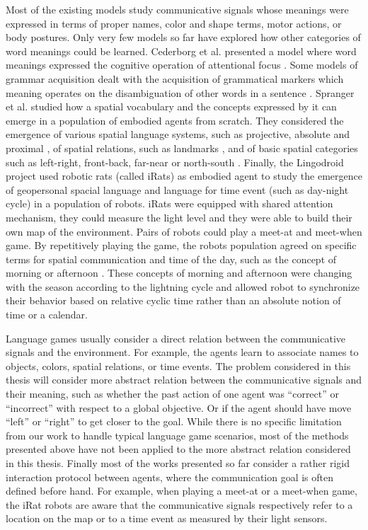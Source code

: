 Most of the existing models study communicative signals whose meanings were expressed in terms of proper names, color and shape terms, motor actions, or body postures. Only very few models so far have explored how other categories of word meanings could be learned. Cederborg et al. presented a model where word meanings expressed the cognitive operation of attentional focus \cite{cederborg2011imitating}. Some models of grammar acquisition dealt with the acquisition of grammatical markers which meaning operates on the disambiguation of other words in a sentence \cite{steels2012fluid}. Spranger et al. studied how a spatial vocabulary and the concepts expressed by it can emerge in a population of embodied agents from scratch. They considered the emergence of various spatial language systems, such as projective, absolute and proximal \cite{spranger2012emergent,spranger2013grounded}, of spatial relations, such as landmarks \cite{spranger2013evolutionary}, and of basic spatial categories such as left-right, front-back, far-near or north-south \cite{spranger2012co}. Finally, the Lingodroid project \cite{schulz2010robots} used robotic rats (called iRats) as embodied agent to study the emergence of geopersonal spacial language and language for time event (such as day-night cycle) in a population of robots. iRats were equipped with shared attention mechanism, they could measure the light level and they were able to build their own map of the environment. Pairs of robots could play a meet-at and meet-when game. By repetitively playing the game, the robots population agreed on specific terms for spatial communication and time of the day, such as the concept of morning or afternoon \cite{schulz2011lingodroids,heath2012long}. These concepts of morning and afternoon were changing with the season according to the lightning cycle and allowed robot to synchronize their behavior based on relative cyclic time rather than an absolute notion of time or a calendar.

Language games usually consider a direct relation between the communicative signals and the environment. For example, the agents learn to associate names to objects, colors, spatial relations, or time events. The problem considered in this thesis will consider more abstract relation between the communicative signals and their meaning, such as whether the past action of one agent was ``correct'' or ``incorrect'' with respect to a global objective. Or if the agent should have move ``left'' or ``right'' to get closer to the goal. While there is no specific limitation from our work to handle typical language game scenarios, most of the methods presented above have not been applied to the more abstract relation considered in this thesis. Finally most of the works presented so far consider a rather rigid interaction protocol between agents, where the communication goal is often defined before hand. For example, when playing a meet-at or a meet-when game, the iRat robots are aware that the communicative signals respectively refer to a location on the map or to a time event as measured by their light sensors.

